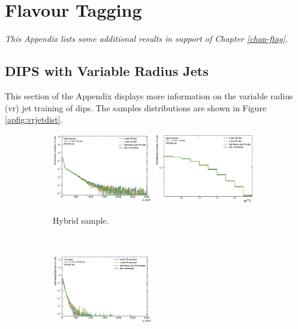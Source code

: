 \chapter{Flavour Tagging}
\ChapFrame
\textit{This Appendix lists some additional results in support of Chapter \ref{chap-ftag}.}

\section{DIPS with Variable Radius Jets}\label{ap-DIPSVR}
This section of the Appendix displays more information on the variable radius (\gls{vr}) jet training of \gls{dips}. The samples distributions are shown in Figure \ref{apfig:vrjetdist}.

\begin{figure}[h!]
  \centering
  \begin{subfigure}[b]{0.98\textwidth}
      \centering
      \includegraphics[width=0.48\textwidth]{Images/FTAG/VRDips/JetDist/hspt.png}
      \includegraphics[width=0.48\textwidth]{Images/FTAG/VRDips/JetDist/hseta.png}
      \caption{Hybrid sample.} 
      \label{apfig:vrjetdisth}
  \end{subfigure}\\
  \begin{subfigure}[b]{0.98\textwidth}
      \centering
      \includegraphics[width=0.48\textwidth]{Images/FTAG/VRDips/JetDist/ttpt.png}

\end{subfigure}
\end{figure}
